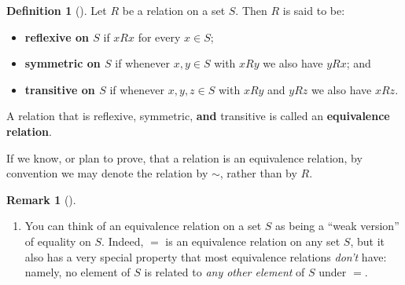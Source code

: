\documentclass[10pt,]{book}
\newcommand{\terminology}[1]{\textbf{#1}}
\theoremstyle{plain}
\theoremstyle{definition}
\newtheorem{definition}[theorem]{Definition}
\theoremstyle{definition}
\newtheorem{remark}[theorem]{Remark}
\theoremstyle{definition}
\theoremstyle{definition}
\numberwithin{equation}{section}
\begin{document}
\begin{definition}[{}]\label{definition-57}
Let \(R\) be a relation on a set \(S\). Then \(R\) is said to be:%
\leavevmode%
\begin{itemize}[label=\textbullet]
\item{}\terminology{reflexive on \(S\)} if \(xR x\) for every \(x\in S\);%
\item{}\terminology{symmetric on \(S\)} if whenever \(x,y\in S\) with \(xR y\) we also have \(yR x\); and%
\item{}\terminology{transitive on \(S\)} if whenever \(x,y,z\in S\) with \(xR y\) and \(yR z\) we also have \(xR z\).%
\end{itemize}
A relation that is reflexive, symmetric, \terminology{and} transitive is called an \terminology{equivalence relation}.%
\par
If we know, or plan to prove, that a relation is an equivalence relation, by convention we may denote the relation by \(\sim\), rather than by \(R\).%
\end{definition}
\begin{remark}[]\label{remark-34}
\leavevmode%
\begin{enumerate}
\item\hypertarget{li-396}{}You can think of an equivalence relation on a set \(S\) as being a ``weak version'' of equality on \(S\).  Indeed, \(=\) is an equivalence relation on any set \(S\), but it also has a very special property that most equivalence relations \emph{don't} have: namely, no element of \(S\) is related to \emph{any other element} of \(S\) under \(=\).%
\end{enumerate}
\end{remark}
\end{document}
